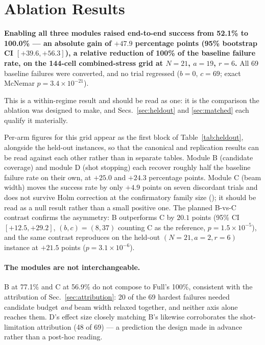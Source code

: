 \section{Ablation Results}
\label{sec:results}

\textbf{Enabling all three modules raised end-to-end success from 52.1\%
to 100.0\% --- an absolute gain of $+47.9$ percentage points (95\%
bootstrap CI $[+39.6, +56.3]$), a relative reduction of 100\% of the
baseline failure rate, on the 144-cell combined-stress grid at $N=21$,
$a=19$, $r=6$.} All 69 baseline failures were converted, and no trial
regressed ($b=0$, $c=69$; exact McNemar $p=3.4\times10^{-21}$).

This is a within-regime result and should be read as one: it is the
comparison the ablation was designed to make, and Secs.~\ref{sec:heldout}
and \ref{sec:matched} each qualify it materially.

Per-arm figures for this grid appear as the first block of
Table~\ref{tab:heldout}, alongside the held-out instances, so that the
canonical and replication results can be read against each other rather
than in separate tables. Module B (candidate coverage) and module D (shot
stopping) each recover roughly half the baseline failure rate on their
own, at $+25.0$ and $+24.3$ percentage points. Module C (beam width)
moves the success rate by only $+4.9$ points on seven discordant trials
and does not survive Holm correction at the confirmatory family size
(\SItables{}); it should be read as a null result rather than a
small positive one. The planned B-vs-C contrast confirms the asymmetry:
B outperforms C by $20.1$ points (95\% CI $[+12.5,+29.2]$, $(b,c)=(8,37)$
counting C as the reference, $p=1.5\times10^{-5}$), and the same contrast
reproduces on the held-out $(N{=}21,a{=}2,r{=}6)$ instance at $+21.5$
points ($p=3.1\times10^{-6}$).



\paragraph{The modules are not interchangeable.} B at 77.1\% and C at
56.9\% do not compose to Full's 100\%, consistent with the attribution of
Sec.~\ref{sec:attribution}: 20 of the 69 hardest failures needed candidate
budget \emph{and} beam width relaxed together, and neither axis alone
reaches them. D's effect size closely matching B's likewise corroborates
the shot-limitation attribution (48 of 69) --- a prediction the design
made in advance rather than a post-hoc reading.

